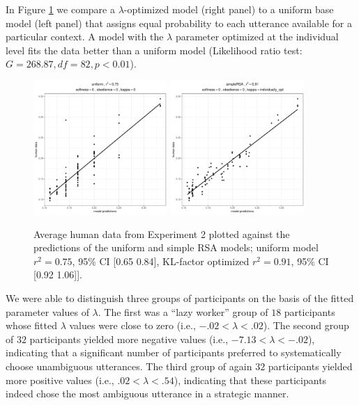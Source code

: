 \documentclass[10pt,a4paper]{article}
\newcommand{\gcs}[1]{\textcolor{blue}{[gcs: #1]}}
\begin{document}
In Figure \ref{kl-factor} we compare a $\lambda$-optimized model (right panel) to a uniform base model (left panel) that assigns equal probability to each utterance available for a particular context.
 A model with the $\lambda$ parameter optimized at the individual level fits the data better than a uniform model  (Likelihood ratio test: $G = 268.87, df = 82, p <0.01$). 
\begin{figure}[ht]
	\centering
	\includegraphics[width=2in]{images/x3_m20.pdf}
	\includegraphics[width=2in]{images/x3_m11.pdf}
	\caption{Average human data from Experiment 2 plotted against the predictions of the uniform and simple RSA models; uniform model  $r^{2}=0.75$, 95\% CI [0.65 0.84], KL-factor optimized  $r^{2}=0.91$, 95\% CI [0.92 1.06]]. }\label{kl-factor}
\end{figure}

We were able to distinguish three groups of participants on the basis of the fitted parameter values of $\lambda$. 
The first was a ``lazy worker'' group of $18$ participants whose fitted $\lambda$ values were close to zero (i.e.,  $-.02 < \lambda<.02$).
The second group of $32$ participants yielded more negative values (i.e., $-7.13<\lambda<-.02$), indicating that a significant number of participants preferred to systematically choose unambiguous utterances. 
The third group of again $32$ participants yielded more positive values (i.e., $.02<\lambda<.54$), indicating that these participants indeed chose the most ambiguous utterance in a strategic manner. 
\end{document}
